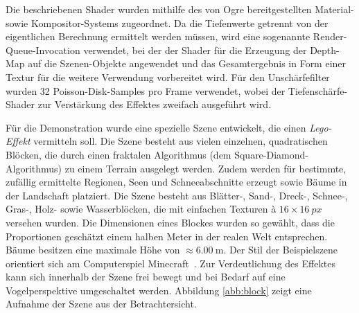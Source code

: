 \documentclass{acmsiggraph}                     %
\begin{document}
Die beschriebenen Shader wurden mithilfe des von Ogre bereitgestellten Material- sowie Kompositor-Systems zugeordnet. Da die Tiefenwerte getrennt von der eigentlichen Berechnung ermittelt werden müssen, wird eine sogenannte Render-Queue-Invocation verwendet, bei der der Shader für die Erzeugung der Depth-Map auf die Szenen-Objekte angewendet und das Gesamtergebnis in Form einer Textur für die weitere Verwendung vorbereitet wird. Für den Unschärfefilter wurden 32 Poisson-Disk-Samples pro Frame verwendet, wobei der Tiefenschärfe-Shader zur Verstärkung des Effektes zweifach ausgeführt wird.

Für die Demonstration wurde eine spezielle Szene entwickelt, die einen \emph{Lego-Effekt} vermitteln soll. Die Szene besteht aus vielen einzelnen, quadratischen Blöcken, die durch einen fraktalen Algorithmus (dem Square-Diamond-Algorithmus) zu einem Terrain ausgelegt werden. Zudem werden für bestimmte, zufällig ermittelte Regionen, Seen und Schneeabschnitte erzeugt sowie Bäume in der Landschaft platziert. Die Szene besteht aus Blätter-, Sand-, Dreck-, Schnee-, Gras-, Holz- sowie Wasserblöcken, die mit einfachen Texturen à $16\times\SI{16}{px}$ versehen wurden. Die Dimensionen eines Blockes wurden so gewählt, dass die Proportionen geschätzt einem halben Meter in der realen Welt entsprechen. Bäume besitzen eine maximale Höhe von  $\approx \SI{6.00}{\meter}$. Der Stil der Beispielszene orientiert sich am Computerspiel Minecraft~\cite{Mojang:2011zr}. Zur Verdeutlichung des Effektes kann sich innerhalb der Szene frei bewegt und bei Bedarf auf eine Vogelperspektive umgeschaltet werden. Abbildung \ref{abb:block} zeigt eine Aufnahme der Szene aus der Betrachtersicht.
\end{document}
